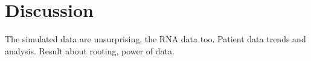 \section{Discussion} \label{sec:discuss}
The simulated data are unsurprising, the RNA data too. Patient data trends and analysis. Result about rooting, power of data.